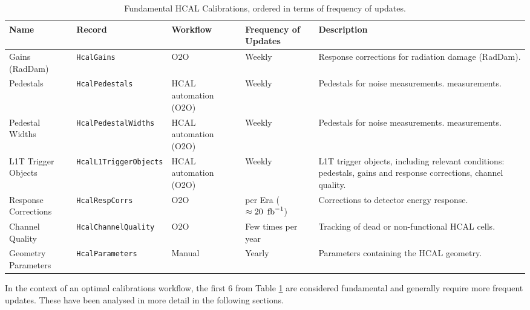 \begin{table}[h!]
    \centering
    \begin{adjustbox}{max width=\textwidth}
    \begin{tabular}{p{3.5cm}|p{4cm}|p{2.5cm}|p{2cm}|p{4.5cm}}
        \textbf{Name} & \textbf{Record} & \textbf{Workflow} & \textbf{Frequency of Updates} & \textbf{Description} \\ \hline
        Gains (RadDam) & \texttt{HcalGains} & O2O & Weekly & Response corrections for radiation damage (RadDam). \\
         Pedestals & \texttt{HcalPedestals} & HCAL automation (O2O) & Weekly & Pedestals for noise measurements.
measurements.\\
        Pedestal Widths & \texttt{HcalPedestalWidths} & HCAL automation (O2O) & Weekly & Pedestals for noise measurements.
measurements. \\
        L1T Trigger Objects & \texttt{HcalL1TriggerObjects} & HCAL automation (O2O) & Weekly & L1T trigger objects, including relevant conditions: pedestals, gains and response corrections, channel quality. \\
        Response Corrections & \texttt{HcalRespCorrs} & O2O & per Era ($\approx 20~\mbox{\ensuremath{\,\text{fb}^{-1}}}$) & Corrections to detector energy response. \\
        Channel Quality & \texttt{HcalChannelQuality} & O2O & Few times per year & Tracking of dead or non-functional HCAL cells. \\
        Geometry Parameters & \texttt{HcalParameters} & Manual & Yearly & Parameters containing the HCAL geometry. \\
    \end{tabular}
    \end{adjustbox}
    \caption{Fundamental HCAL Calibrations, ordered in terms of frequency of updates.}
    \label{tab:HCALCalibrations_critical}
\end{table}

In the context of an optimal calibrations workflow, the first 6 from Table \ref{tab:HCALCalibrations_critical} are considered fundamental and generally require more frequent updates. These have been analysed in more detail in the following sections. %

